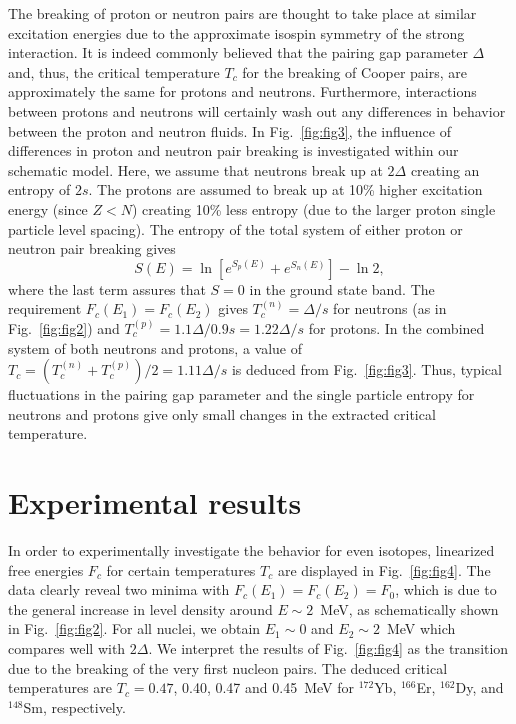 \begin{multicols}{2}
The breaking of proton or neutron pairs are thought to take place at similar 
excitation energies due to the approximate isospin symmetry of the strong 
interaction. It is indeed commonly believed that the pairing gap parameter 
$\Delta$ and, thus, the critical temperature $T_c$ for the breaking of Cooper 
pairs, are approximately the same for protons and neutrons. Furthermore, 
interactions between protons and neutrons will certainly wash out any 
differences in behavior between the proton and neutron fluids. In Fig.\ 
\ref{fig:fig3}, the influence of differences in proton and neutron pair 
breaking is investigated within our schematic model. Here, we assume that 
neutrons break up at $2\Delta$ creating an entropy of $2s$. The protons are 
assumed to break up at 10\% higher excitation energy (since $Z<N$) creating 
10\% less entropy (due to the larger proton single particle level spacing). The
entropy of the total system of either proton or neutron pair breaking gives
\begin{equation}
S(E)=\ln\left[e^{S_p(E)}+e^{S_n(E)}\right]-\ln2,
\end{equation}
where the last term assures that $S=0$ in the ground state band. The 
requirement $F_c(E_1)=F_c(E_2)$ gives $T_c^{(n)}=\Delta/s$ for neutrons (as in 
Fig.\ \ref{fig:fig2}) and $T_c^{(p)}=1.1\Delta/0.9s=1.22\Delta/s$ for protons. 
In the combined system of both neutrons and protons, a value of 
$T_c=(T_c^{(n)}+T_c^{(p)})/2=1.11\Delta/s$ is deduced from Fig.\ 
\ref{fig:fig3}. Thus, typical fluctuations in the pairing gap parameter and the
single particle entropy for neutrons and protons give only small changes in the
extracted critical temperature.

\section{Experimental results}

In order to experimentally investigate the behavior for even isotopes, 
linearized free energies $F_c$ for certain temperatures $T_c$ are displayed in 
Fig.\ \ref{fig:fig4}. The data clearly reveal two minima with 
$F_c(E_1)=F_c(E_2)=F_0$, which is due to the general increase in level density 
around $E\sim 2$~MeV, as schematically shown in Fig.\ \ref{fig:fig2}. For all 
nuclei, we obtain $E_1\sim 0$ and $E_2\sim 2$~MeV which compares well with 
$2\Delta$. We interpret the results of Fig.\ \ref{fig:fig4} as the transition 
due to the breaking of the very first nucleon pairs. The deduced critical 
temperatures are $T_c=0.47$, 0.40, 0.47 and 0.45~MeV for $^{172}$Yb, 
$^{166}$Er, $^{162}$Dy, and $^{148}$Sm, respectively.


\end{multicols}
